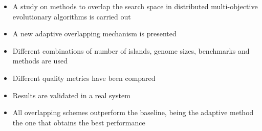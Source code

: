 \documentclass{article}
\begin{document}




\begin{itemize}
\item A study on methods to overlap the search space in distributed multi-objective evolutionary algorithms is carried out
\item A new adaptive overlapping mechanism is presented
\item Different combinations of number of islands, genome sizes, benchmarks and methods are used
\item Different quality metrics have been compared
\item Results are validated in a real system
\item All overlapping schemes outperform the baseline, being the adaptive method the one that obtains the best performance
\end{itemize}
\end{document}
